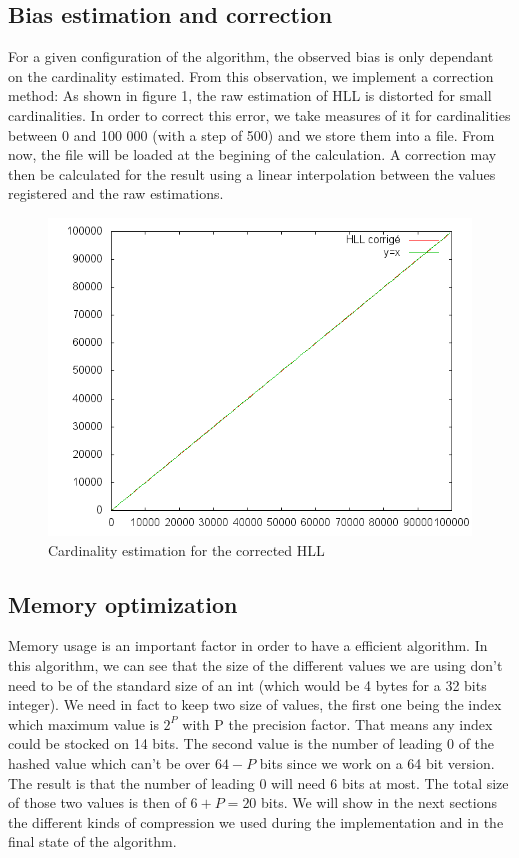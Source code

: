 \documentclass{article}
\begin{document}
\subsection{Bias estimation and correction}
For a given configuration of the algorithm, the observed bias is only
dependant on the cardinality estimated. From this observation, we
implement a correction method: As shown in figure 1, the raw
estimation of HLL is distorted for small cardinalities. In order to
correct this error, we take measures of it for cardinalities between 0
and 100 000 (with a step of 500) and we store them into a file. From
now, the file will be loaded at the begining of the calculation. A
correction may then be calculated for the result using a linear
interpolation between the values registered and the raw estimations.

\begin{center}
\begin{figure}[h]
\includegraphics[scale=0.7]{img02.png}
\caption{Cardinality estimation for the corrected HLL}
\end{figure}
\end{center}


\subsection{Memory optimization}
Memory usage is an important factor in order to have a efficient algorithm. In this algorithm, we can see that 
the size of the different values we are using don't need to be of the standard size of an int (which would be 4 
bytes for a 32 bits integer). We need in fact to keep two size of values, the first one being the index which 
maximum value is $2^{P}$ with P the precision factor. That means any index could be stocked on 14 bits. The 
second value is the number of leading 0 of the hashed value which can't be over $64-P$ bits since we work on a 64 
bit version. The result is that the number of leading 0 will need 6 bits at most. The total size of those two 
values is then of $6+P = 20$ bits. We will show in the next sections the different kinds of compression we used 
during the implementation and in the final state of the algorithm.
\end{document}
